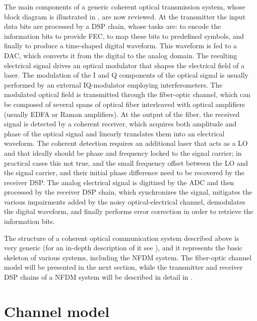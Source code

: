 The main components
of a generic coherent optical transmission system, whose block diagram is illustrated
in , are now reviewed. At the transmitter the input data bits are
processed by a \ac{DSP} chain, whose tasks are: to encode the information bits to provide
\ac{FEC}, to map these bits to predefined symbols, and finally to produce a time-shaped digital waveform. This waveform is fed to a
\ac{DAC}, which converts it from the digital to the analog  domain. The
resulting electrical signal drives an optical modulator that shapes the electrical field of a
laser. The modulation of the \ac{I} and \ac{Q} components of the optical signal is usually performed by an external
\ac{I}\ac{Q}-modulator employing \mz{} interferometers. The modulated optical field is
transmitted through the fiber-optic channel, which can be composed of several
spans of optical fiber interleaved with optical amplifiers (usually \ac{EDFA} or
Raman amplifiers). At the output of the fiber, the received signal is detected by a
coherent receiver, which acquires both amplitude and phase of the optical signal and linearly
translates them into an electrical waveform. The coherent detection requires an additional laser that acts as a
\ac{LO} and that ideally should be phase and frequency locked to the signal carrier; in practical cases this not true, and the
small frequency offset between the \ac{LO} and the signal carrier, and their initial phase difference need to be recovered by the receiver \ac{DSP}. The analog electrical signal is digitized by the \ac{ADC}
and then processed by the receiver \ac{DSP} chain, which synchronizes the signal, mitigates the
various impairments added by the noisy optical-electrical channel,
demodulates the digital waveform, and finally performs error correction in order to retrieve the information bits.

The structure of a coherent optical communication system described above is very generic (for an in-depth description of it see \cite{Agrawal12_NonlinearFOs_Book, proakisdigital, seimetz2009high}), and it represents the basic skeleton of various systems, including the \ac{NFDM} system.
The fiber-optic channel model will be presented in the next section, while the transmitter and receiver \ac{DSP} chains of a \ac{NFDM} system will be described in detail in .


\section{Channel model}\label{sec:channel_model_NLSE}

